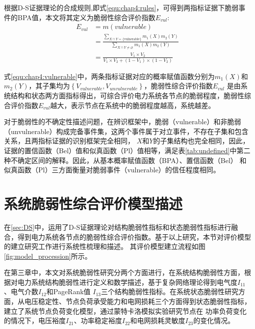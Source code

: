 根据D-S证据理论的合成规则,即式\ref{equ:chap4:rules}，可得到两指标证据下脆弱事件的BPA值，本文将其定义为脆弱性综合评价指数$E_{vul}$:
\begin{equation}
\label{equ:chap4:vulnerable}
\begin{aligned} E_{vul} &=m(vulnerable) \\ 
 &=\frac{\sum_{X \cap Y=\{\text {vulnerable}\}} m_{1}(X) m_{2}(Y)}{\sum_{X \cap Y \neq \varnothing} m_{1}(X) m_{2}(Y)} \\
 &=\frac{V_{1} \times V_{2}}{V_{1} \times V_{2}+\left(1-V_{1}\right) \times\left(1-V_{2}\right)} \end{aligned}
\end{equation}

式\ref{equ:chap4:vulnerable}中，两条指标证据对应的概率赋值函数分别为$m_1(X)$和$m_2(Y)$，其子集均为$\left\{V_{vulnerable},V_{unvulnerable} \right\}$，脆弱性综合评价指数$E_{vul}$
是由系统结构和状态两方面指标得出，可综合评价电力系统各节点的脆弱程度，脆弱性综合评价指数$E_{vul}$越大，表示节点在系统中的脆弱程度越高，系统越差。

对于脆弱性的不确定性描述问题，在辨识框架中，脆弱（vulnerable）和非脆弱（unvulnerable）构成完备事件集，这两个事件属于对立事件，不存在子集和包含关系，且两指标证据的识别框架完全相同，
$X$和$Y$的子集结构也完全相同，因此，证据的置信函数（Bel）值和似真函数（Pl）值相等，满足表\ref{tab:undefined}中第二种不确定区间的解释。因此，从基本概率赋值函数（BPA）、置信函数（Bel）
和似真函数（Pl）三方面衡量对脆弱事件（vulnerable）的信任程度相同。

\section{系统脆弱性综合评价模型描述}
\label{sec:systemQuan}
在\ref{sec:DS}中，运用了D-S证据理论对结构脆弱性指标和状态脆弱性指标进行融合，得到电力系统各节点的脆弱性综合评价指数。基于以上研究，本节对评价模型的建立研究工作进行系统性梳理和描述。
其评价模型建立流程如图\ref{fig:model_procession}所示。

在第三章中，本文对系统脆弱性研究分两个方面进行，在系统结构脆弱性方面，根据对电力系统结构脆弱性进行定义和数学描述，基于复杂网络理论得到电气度$I_{11}$、电气介数$I_{12}$和PageRank值
$I_{13}$三个结构脆弱性指标。在系统状态脆弱性研究方面，从电压稳定性、节点负荷承受能力和电网损耗三个方面得到状态脆弱性指标，建立了系统节点负荷变化模型，通过蒙特卡洛模拟实验研究节点在
功率负荷变化的情况下，电压裕度$I_{21}$、功率稳定裕度$I_{22}$和电网损耗灵敏度$I_{23}$的变化情况。

